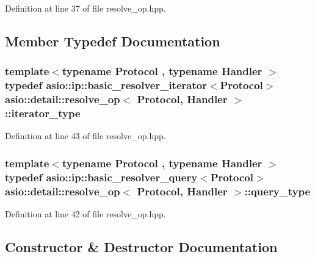 Definition at line 37 of file resolve\+\_\+op.\+hpp.



\subsection{Member Typedef Documentation}
\hypertarget{classasio_1_1detail_1_1resolve__op_a8fb28ab524444ef950accb0cdc144579}{}
\subsubsection[{iterator\+\_\+type}]{\setlength{\rightskip}{0pt plus 5cm}template$<$typename Protocol , typename Handler $>$ typedef {\bf asio\+::ip\+::basic\+\_\+resolver\+\_\+iterator}$<$Protocol$>$ {\bf asio\+::detail\+::resolve\+\_\+op}$<$ Protocol, Handler $>$\+::{\bf iterator\+\_\+type}}\label{classasio_1_1detail_1_1resolve__op_a8fb28ab524444ef950accb0cdc144579}


Definition at line 43 of file resolve\+\_\+op.\+hpp.

\hypertarget{classasio_1_1detail_1_1resolve__op_a53f417f33afa9bc3982e7d951593ca65}{}
\subsubsection[{query\+\_\+type}]{\setlength{\rightskip}{0pt plus 5cm}template$<$typename Protocol , typename Handler $>$ typedef {\bf asio\+::ip\+::basic\+\_\+resolver\+\_\+query}$<$Protocol$>$ {\bf asio\+::detail\+::resolve\+\_\+op}$<$ Protocol, Handler $>$\+::{\bf query\+\_\+type}}\label{classasio_1_1detail_1_1resolve__op_a53f417f33afa9bc3982e7d951593ca65}


Definition at line 42 of file resolve\+\_\+op.\+hpp.



\subsection{Constructor \& Destructor Documentation}
\hypertarget{classasio_1_1detail_1_1resolve__op_a3d173ce305083f6b89addb2d4e599ed0}{}
